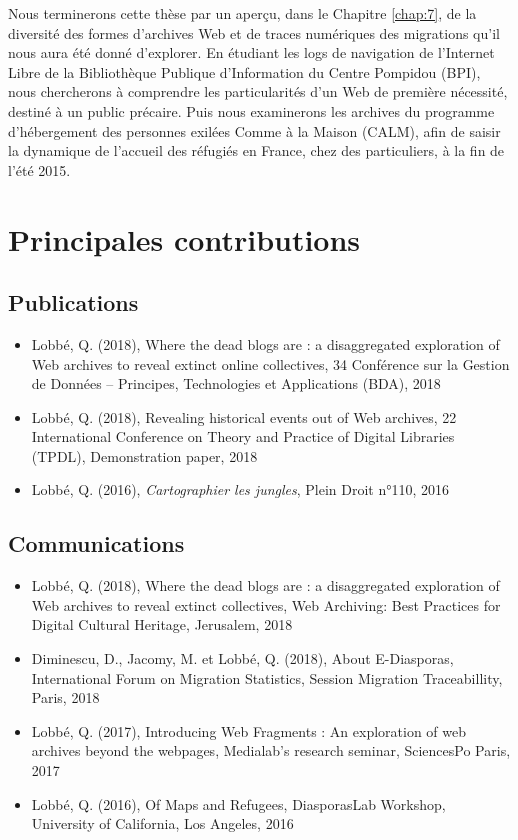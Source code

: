 \documentclass[symmetric,justified,marginals=raggedouter]{tufte-book}
\begin{document}
Nous terminerons cette thèse par un aperçu, dans le Chapitre \ref{chap:7}, de la diversité des formes d'archives Web et de traces numériques des migrations qu'il nous aura été donné d'explorer. En étudiant les logs de navigation de l'Internet Libre de la Bibliothèque Publique d'Information du Centre Pompidou (BPI), nous chercherons à comprendre les particularités d'un Web de première nécessité, destiné à un public précaire. Puis nous examinerons les archives du programme d'hébergement des personnes exilées Comme à la Maison (CALM), afin de saisir la dynamique de l'accueil des réfugiés en France, chez des particuliers, à la fin de l'été 2015.

\newpage

\section*{Principales contributions}
\label{sec:1_contributions}

\subsection{Publications}

\begin{itemize}[leftmargin=*]  
\item Lobbé, Q. (2018), Where the dead blogs are : a disaggregated exploration of Web archives to reveal extinct online collectives, 34\ieme{} Conférence sur la Gestion de Données – Principes, Technologies et Applications (BDA), 2018
\item Lobbé, Q. (2018), Revealing historical events out of Web archives, 22\ieme{} International Conference on Theory and Practice of Digital Libraries (TPDL), Demonstration paper, 2018
\item Lobbé, Q. (2016), \textit{Cartographier les jungles}, Plein Droit n°110, 2016
\end{itemize}

\subsection{Communications}

\begin{itemize}[leftmargin=*] 
\item Lobbé, Q. (2018), Where the dead blogs are : a disaggregated exploration of Web archives to reveal extinct collectives, Web Archiving: Best Practices for Digital Cultural Heritage, Jerusalem, 2018 
\item Diminescu, D., Jacomy, M. et Lobbé, Q. (2018), About E-Diasporas, International Forum on Migration Statistics, Session Migration Traceabillity, Paris, 2018
\item Lobbé, Q. (2017), Introducing Web Fragments : An exploration of web archives beyond the webpages, Medialab’s research seminar, SciencesPo Paris, 2017
\item Lobbé, Q. (2016), Of Maps and Refugees, DiasporasLab Workshop, University of California, Los Angeles, 2016
\end{itemize}
\end{document}
